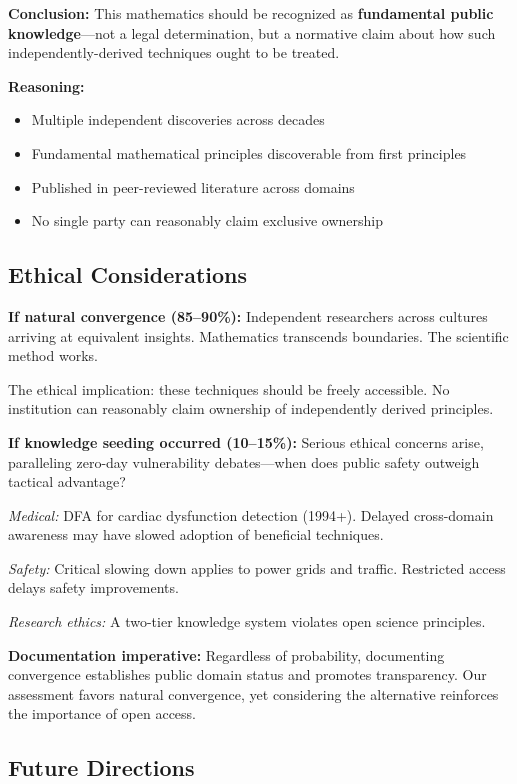 \documentclass[11pt]{article}
\begin{document}
\textbf{Conclusion:} This mathematics should be recognized as \textbf{fundamental public knowledge}---not a legal determination, but a normative claim about how such independently-derived techniques ought to be treated.

\textbf{Reasoning:}
\begin{itemize}
    \item Multiple independent discoveries across decades
    \item Fundamental mathematical principles discoverable from first principles
    \item Published in peer-reviewed literature across domains
    \item No single party can reasonably claim exclusive ownership
\end{itemize}

\subsection{Ethical Considerations}

\textbf{If natural convergence (85--90\%):} Independent researchers across cultures arriving at equivalent insights. Mathematics transcends boundaries. The scientific method works.

The ethical implication: these techniques should be freely accessible. No institution can reasonably claim ownership of independently derived principles.

\textbf{If knowledge seeding occurred (10--15\%):} Serious ethical concerns arise, paralleling zero-day vulnerability debates---when does public safety outweigh tactical advantage?

\textit{Medical:} DFA for cardiac dysfunction detection (1994+). Delayed cross-domain awareness may have slowed adoption of beneficial techniques.

\textit{Safety:} Critical slowing down applies to power grids and traffic. Restricted access delays safety improvements.

\textit{Research ethics:} A two-tier knowledge system violates open science principles.

\textbf{Documentation imperative:} Regardless of probability, documenting convergence establishes public domain status and promotes transparency. Our assessment favors natural convergence, yet considering the alternative reinforces the importance of open access.

\subsection{Future Directions}
\end{document}
